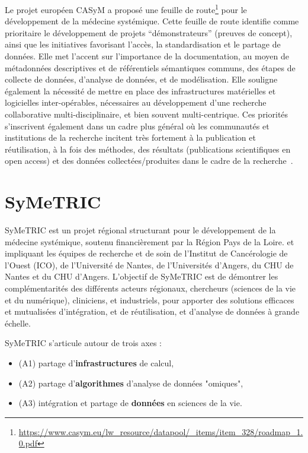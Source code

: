 \documentclass[a4paper,10pt]{article}
\theoremstyle{definition}
\begin{document}
Le projet européen CASyM a proposé une feuille de route\footnote{\url{https://www.casym.eu/lw_resource/datapool/_items/item_328/roadmap_1.0.pdf}} pour le dévelop\-pement de la médecine systémique. Cette feuille de route identifie comme prioritaire le développement de projets “démonstrateurs” (preuves de concept), ainsi que les initiatives favorisant l’accès, la standardisation et le partage de données. Elle met l’accent sur l’importance de la documentation, au moyen de métadonnées descriptives et de référentiels sémantiques communs, des étapes de collecte de données, d’analyse de données, et de modélisation. Elle souligne également la nécessité de mettre en place des infrastructures matérielles et logicielles inter-opérables, nécessaires au développement d’une recherche collaborative multi-disciplinaire, et bien souvent multi-centrique. Ces priorités s'inscrivent également dans un cadre plus général où les communautés et institutions de la recherche incitent très fortement à la publication et réutilisation, à la fois des méthodes, des résultats (publications scientifiques en open access) et des données collectées/produites dans le cadre de la recherche~\cite{wilkinson2016fair}. 

\section{SyMeTRIC}
SyMeTRIC est un projet régional structurant pour le développement de la médecine systémique, soutenu financièrement par la Région Pays de la Loire. et impliquant les équipes de recherche et de soin de l’Institut de Cancérologie de l’Ouest (ICO), de l’Université de Nantes, de l’Universités d’Angers, du CHU de Nantes et du CHU d’Angers. L'objectif de SyMeTRIC est de démontrer les complémentarités des différents acteurs régionaux, chercheurs (sciences de la vie et du numérique), cliniciens, et industriels, pour apporter des solutions efficaces et mutualisées d'intégration, et de réutilisation, et d'analyse de données à grande échelle. 

\begin{tcolorbox}
SyMeTRIC s'articule autour de trois axes : 
\begin{itemize}
	\item (A1) partage d'{\bf infrastructures} de calcul,
	\item (A2) partage d'{\bf algorithmes} d'analyse de données "omiques",
	\item (A3) intégration et partage de {\bf données} en sciences de la vie. 
\end{itemize}
\end{tcolorbox}
\end{document}
